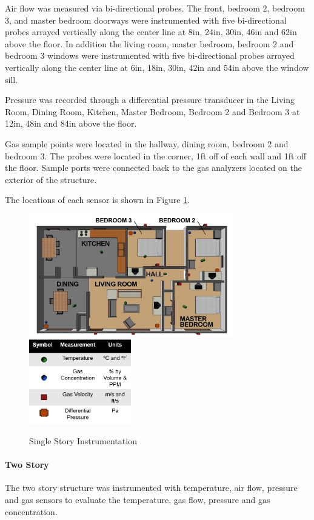 \documentclass{article}
\begin{document}
Air flow was measured via bi-directional probes. The front, bedroom 2, bedroom 3, and master bedroom doorways were instrumented with five bi-directional probes arrayed vertically along the center line at 8in, 24in, 30in, 46in and 62in above the floor. In addition the living room, master bedroom, bedroom 2 and bedroom 3 windows were instrumented with five bi-directional probes arrayed vertically along the center line at 6in, 18in, 30in, 42in and 54in above the window sill. 

Pressure was recorded through a differential pressure transducer in the Living Room, Dining Room, Kitchen, Master Bedroom, Bedroom 2 and Bedroom 3 at 12in, 48in and 84in above the floor. 

Gas sample points were located in the hallway, dining room, bedroom 2 and bedroom 3. The probes were located in the corner, 1ft off of each wall and 1ft off the floor. Sample ports were connected back to the gas analyzers located on the exterior of the structure. 

The locations of each sensor is shown in Figure \ref{fig:SingleStoryInst}.

\begin{figure}[H]
	\centering
	\includegraphics[width = 3.5in]{0_Images/Instrumentation/Single_Story_Instrumentation.png}
	\includegraphics[width = 1.75in]{0_Images/Instrumentation/Single_Story_Instrumentation_Key2.png}
	\caption{Single Story Instrumentation}
	\label{fig:SingleStoryInst}
\end{figure}

\paragraph{Two Story} \mbox{}
The two story structure was instrumented with temperature, air flow, pressure and gas sensors to evaluate the temperature, gas flow, pressure and gas concentration. 
\end{document}
